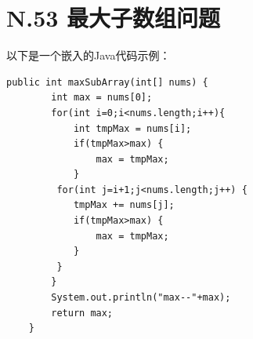 \documentclass[10pt]{article}
\begin{document}
\newpage
\section{N.53 最大子数组问题}
以下是一个嵌入的Java代码示例：
\begin{lstlisting}[style=java, caption={HelloWorld.java}]
public int maxSubArray(int[] nums) {
        int max = nums[0];
        for(int i=0;i<nums.length;i++){
            int tmpMax = nums[i];
            if(tmpMax>max) {
                max = tmpMax;
            }
         for(int j=i+1;j<nums.length;j++) {
            tmpMax += nums[j];
            if(tmpMax>max) {
                max = tmpMax;
            }
         }
        }
        System.out.println("max--"+max);
        return max;
    }
\end{lstlisting}
\end{document}
